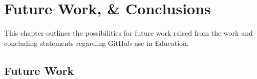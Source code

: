 \chapter{Future Work, \& Conclusions}

This chapter outlines the possibilities for future work raised from the work and concluding statements regarding GitHub use in Education.

\section{Future Work}

